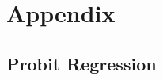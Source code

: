 \label{sec:example_applications}



\section{Appendix}
%
\subsection{Probit Regression}
\label{sec:probit_review}



